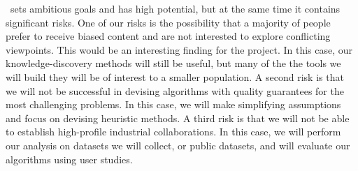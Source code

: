 \documentclass[a4paper,11pt]{article}
\begin{document}
\acronym\ sets ambitious goals and has high potential, 
but at the same time it contains significant risks.
One of our risks is the possibility 
that a majority of people prefer to receive biased content
and are not interested to explore conflicting viewpoints.
This would be an in\-ter\-est\-ing finding for the project.
In this case, our knowledge-discovery methods will still be useful, 
but many of the the tools we will build they will be of interest to a smaller population.
A second risk is that we will not be successful in devising 
algorithms with quality guarantees for the most challenging problems. 
In this case, we will make simplifying assumptions and 
focus on devising heuristic methods. 
A third risk is that we will not be able to establish high-profile industrial collaborations. 
In this case, we will perform our analysis on datasets we will collect, 
or public datasets, and will evaluate our algorithms using user studies. 

\newpage
{%
\setlength{\bibsep}{1pt}


}
\end{document}
